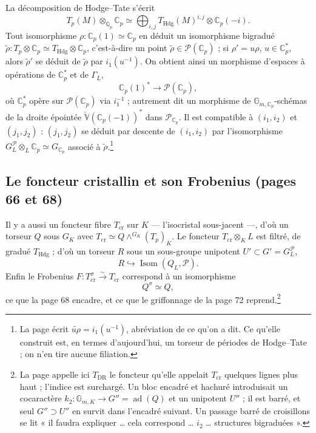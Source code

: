 \documentclass[11pt,a4paper]{article}
\begin{document}
La décomposition de Hodge--Tate s'écrit
\[
T_{p}(M) \otimes_{\mathbb{Q}_{p}} \mathbb{C}_{p} \simeq \bigoplus_{i,j}
T_{\mathrm{Hdg}}(M)^{i,j} \otimes \mathbb{C}_{p}(-i) .
\]
Tout isomorphisme $\rho\colon \mathbb{C}_{p}(1) \simeq \mathbb{C}_{p}$ en
déduit un isomorphisme bigradué $\tilde\rho\colon T_{p} \otimes \mathbb{C}_{p}
\simeq T_{\mathrm{Hdg}} \otimes \mathbb{C}_{p}$, c'est-à-dire un point
$\tilde\rho \in \mathcal{P}(\mathbb{C}_{p})$ ; si $\rho' = u\rho$, $u \in
\mathbb{C}_{p}^{*}$, alors $\tilde\rho'$ se déduit de $\tilde\rho$ par
$i_{1}(u^{-1})$. On obtient ainsi un morphisme d'espaces à opérations de
$\mathbb{C}_{p}^{*}$ et de $\Gamma_{L}$,
\[
\mathbb{C}_{p}(1)^{*} \longrightarrow \mathcal{P}(\mathbb{C}_{p}),
\]
où $\mathbb{C}_{p}^{*}$ opère sur $\mathcal{P}(\mathbb{C}_{p})$ via
$i_{1}^{-1}$ ; autrement dit un morphisme de
$\mathbb{G}_{m,\mathbb{C}_{p}}$-schémas de la droite épointée
$\check{\mathbb{V}}(\mathbb{C}_{p}(-1))^{*}$ dans $\mathcal{P}_{\mathbb{C}_{p}}$.
Il est compatible à $(i_{1}, i_{2})$ et $(j_{1}, j_{2})$ : $(j_{1}, j_{2})$ se
déduit par descente de $(i_{1}, i_{2})$ par l'isomorphisme
$G_{L}^{\mathcal{P}} \otimes_{L} \mathbb{C}_{p} \simeq G_{\mathbb{C}_{p}}$
associé à $\tilde\rho$.\footnote{La page écrit $\widetilde{u\rho} =
i_{1}(u^{-1})$, abréviation de ce qu'on a dit. Ce qu'elle construit est, en
termes d'aujourd'hui, un torseur de périodes de Hodge--Tate ; on n'en tire
aucune filiation.}

\subsection*{Le foncteur cristallin et son Frobenius (pages 66 et 68)}

Il y a aussi un foncteur fibre $T_{\mathrm{cr}}$ sur $K$ — l'isocristal
sous-jacent —, d'où un torseur $Q$ sous $G_{K}$ avec $T_{\mathrm{cr}} \simeq
Q \wedge^{G_{K}} (T_{p})_{K}$. Le foncteur $T_{\mathrm{cr}} \otimes_{K} L$ est
filtré, de gradué $T_{\mathrm{Hdg}}$ ; d'où un torseur $R$ sous un sous-groupe
unipotent $U' \subset G' = G_{L}^{\mathcal{P}}$,
\[
R \hookrightarrow \operatorname{Isom}(Q_{L}, \mathcal{P}) .
\]
Enfin le Frobenius $F\colon T_{\mathrm{cr}}^{\sigma} \xrightarrow{\sim}
T_{\mathrm{cr}}$ correspond à un isomorphisme
\[
Q^{\sigma} \simeq Q ,
\]
ce que la page 68 encadre, et ce que le griffonnage de la page 72 reprend.\footnote{La page appelle ici $T_{\mathrm{DR}}$ le foncteur qu'elle appelait
$T_{\mathrm{cr}}$ quelques lignes plus haut ; l'indice est surchargé. Un bloc
encadré et hachuré introduisait un cocaractère $k_{2}\colon
\mathbb{G}_{m,K} \to G'' = \operatorname{ad}(Q)$ et un unipotent $U''$ ; il
est barré, et seul $G'' \supset U''$ en survit dans l'encadré suivant. Un
passage barré de croisillons se lit « il faudra expliquer \ldots{} cela
correspond \ldots{} $i_{2}$ \ldots{} structures bigraduées ».}
\end{document}
